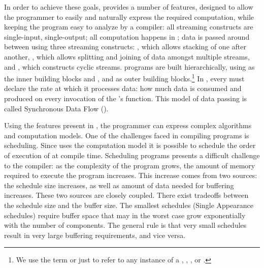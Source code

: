 In order to achieve these goals, {\StreamIt} provides a number of
features, designed to allow the programmer to easily and naturally
express the required computation, while keeping the program easy
to analyze by a compiler: all {\StreamIt} streaming constructs are
single-input, single-output; all computation happens in
{\filters}; data is passed around between {\filters} using three
streaming constructs: {\pipeline}, which allows stacking of
{\filters} one after another, {\splitjoin}, which allows splitting
and joining of data amongst multiple streams, and {\feedbackloop},
which constructs cyclic streams. {\StreamIt} programs are built
hierarchically, using {\filters} as the inner building blocks and
{\pipelines}, {\splitjoins} and {\feedbackloops} as outer building
blocks.\footnote{We use the term {\stream} {\operator} or just
{\operator} to refer to any instance of a {\filter}, {\pipeline},
{\splitjoin}, or {\feedbackloop}.} In {\StreamIt}, every {\filter}
must declare the rate at which it processes data: how much data is
consumed and produced on every invocation of the {\filter}'s
{\work} function. This model of data passing is called Synchronous
Data Flow ({\SDF}).

\begin{comment}
In addition to {\SDF}, {\StreamIt} allows the programmer to pass
data between {\filters} in an asynchronous manner, similar to a
combination of message passing and function calls. Timing of such
data delivery is expressed in terms of amount of information
wavefronts - the programmer can specify a delay between message
delivery and destination {\filter}'s processing of data currently
being produced or consumed by the source {\filter}.  Such timing
mechanism introduces latency and buffering constraints on
execution of {\StreamIt} programs.
\end{comment}

Using the features present in {\StreamIt}, the programmer can
express complex algorithms and computation models.  One of the
challenges faced in compiling {\StreamIt} programs is scheduling.
Since {\StreamIt} uses the {\SDF} computation model it is possible
to schedule the order of execution of {\filters} at compile time.
Scheduling {\SDF} programs presents a difficult challenge to the
compiler:  as the complexity of the program grows, the amount of
memory required to execute the program increases.  This increase
comes from two sources: the schedule size increases, as well as
amount of data needed for buffering increases.  These two sources
are closely coupled. There exist tradeoffs between the schedule
size and the buffer size. The smallest schedules (Single
Appearance schedules) require buffer space that may in the worst
case grow exponentially with the number of components. The general
rule is that very small schedules result in very large buffering
requirements, and vice versa.

